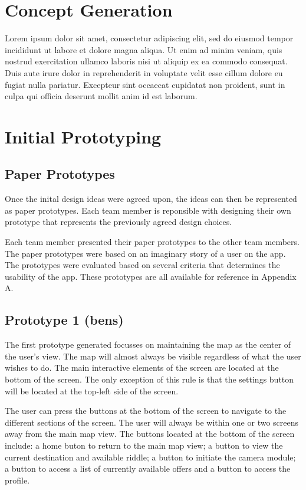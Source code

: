 \documentclass[a4,10pt,twocolumn]{article}
\begin{document}
\section*{Concept Generation}
Lorem ipsum dolor sit amet, consectetur adipiscing elit, sed do eiusmod tempor incididunt ut labore et dolore magna aliqua. Ut enim ad minim veniam, quis nostrud exercitation ullamco laboris nisi ut aliquip ex ea commodo consequat. Duis aute irure dolor in reprehenderit in voluptate velit esse cillum dolore eu fugiat nulla pariatur. Excepteur sint occaecat cupidatat non proident, sunt in culpa qui officia deserunt mollit anim id est laborum.

\section*{Initial Prototyping}
\subsection*{Paper Prototypes}
Once the inital design ideas were agreed upon, the ideas can then be represented as paper prototypes. Each team member is reponsible with designing their own prototype that represents the previously agreed design choices.

Each team member presented their paper prototypes to the other team members. The paper prototypes were based on an imaginary story of a user on the app. The prototypes were evaluated based on several criteria that determines the usability of the app. These prototypes are all available for reference in Appendix A.

\subsection*{Prototype 1 (bens)}
The first prototype generated focusses on maintaining the map as the center of the user's view. The map will almost always be visible regardless of what the user wishes to do. The main interactive elements of the screen are located at the bottom of the screen. The only exception of this rule is that the settings button will be located at the top-left side of the screen.

The user can press the buttons at the bottom of the screen to navigate to the different sections of the screen. The user will always be within one or two screens away from the main map view. The buttons located at the bottom of the screen include: a home buton to return to the main map view; a button to view the current destination and available riddle; a button to initiate the camera module; a button to access a list of currently available offers and a button to access the profile.
\end{document}
